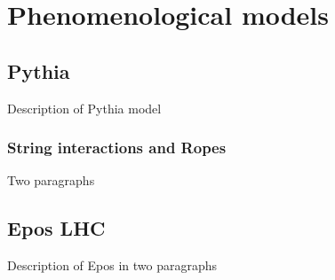 


\section{Phenomenological models}

\subsection{Pythia}

Description of Pythia model

\subsubsection{String interactions and Ropes}

Two paragraphs


\subsection{Epos LHC}

Description of Epos in two paragraphs

